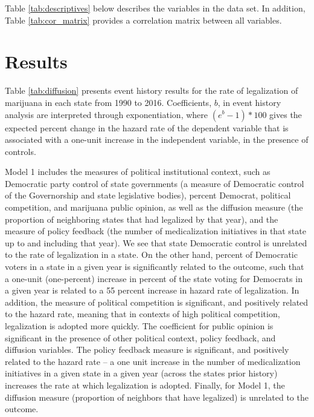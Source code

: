 Table \ref{tab:descriptives} below describes the variables in the data set. In addition, Table \ref{tab:cor_matrix} provides a correlation matrix between all variables. 




\section{Results}

Table \ref{tab:diffusion} presents event history results for the rate of legalization of marijuana in each state from 1990 to 2016. Coefficients, $b$, in event history analysis are interpreted through exponentiation, where $(e^{b} - 1)*100$ gives the expected percent change in the hazard rate of the dependent variable that is associated with a one-unit increase in the independent variable, in the presence of controls. 

Model 1 includes the measures of political institutional context, such as Democratic party control of state governments (a measure of Democratic control of the Governorship and state legislative bodies), percent Democrat, political competition, and marijuana public opinion, as well as the diffusion measure (the proportion of neighboring states that had legalized by that year), and the measure of policy feedback (the number of medicalization initiatives in that state up to and including that year). We see that state Democratic control is unrelated to the rate of legalization in a state. On the other hand, percent of Democratic voters in a state in a given year is significantly related to the outcome, such that a one-unit (one-percent) increase in percent of the state voting for Democrats in a given year is related to a 55 percent increase in hazard rate of legalization. In addition, the measure of political competition is significant, and positively related to the hazard rate, meaning that in contexts of high political competition, legalization is adopted more quickly. The coefficient for public opinion is significant in the presence of other political context, policy feedback, and diffusion variables. The policy feedback measure is significant, and positively related to the hazard rate -- a one unit increase in the number of medicalization initiatives in a given state in a given year (across the states prior history) increases the rate at which legalization is adopted. Finally, for Model 1, the diffusion measure (proportion of neighbors that have legalized) is unrelated to the outcome. 





